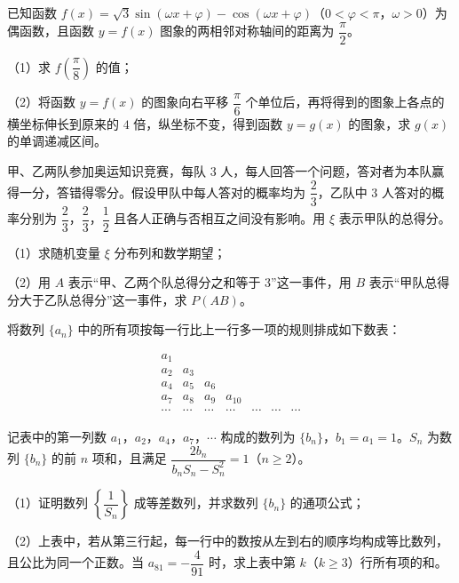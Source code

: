 \begin{question}
已知函数 $f(x)=\sqrt3\sin(\omega x+\varphi)-\cos(\omega x+\varphi)$（$0<\varphi<\pi$，$\omega>0$）为偶函数，且函数 $y=f(x)$ 图象的两相邻对称轴间的距离为 $\dfrac{\pi}{2}$。

（1）求 $f\left(\dfrac{\pi}{8}\right)$ 的值；

（2）将函数 $y=f(x)$ 的图象向右平移 $\dfrac{\pi}{6}$ 个单位后，再将得到的图象上各点的横坐标伸长到原来的 $4$ 倍，纵坐标不变，得到函数 $y=g(x)$ 的图象，求 $g(x)$ 的单调递减区间。

\end{question}
\begin{question}
甲、乙两队参加奥运知识竞赛，每队 $3$ 人，每人回答一个问题，答对者为本队赢得一分，答错得零分。假设甲队中每人答对的概率均为 $\dfrac23$，乙队中 $3$ 人答对的概率分别为 $\dfrac23$，$\dfrac23$，$\dfrac12$ 且各人正确与否相互之间没有影响。用 $\xi$ 表示甲队的总得分。

（1）求随机变量 $\xi$ 分布列和数学期望；

（2）用 $A$ 表示“甲、乙两个队总得分之和等于 $3$”这一事件，用 $B$ 表示“甲队总得分大于乙队总得分”这一事件，求 $P(AB)$。

\end{question}
\begin{question}
将数列 $\{a_n\}$ 中的所有项按每一行比上一行多一项的规则排成如下数表：

\nopagebreak[4]
\[\begin{array}{ccccccc}
a_1&&&&&&\\
a_2&a_3&&&&&\\
a_4&a_5&a_6&&&&\\
a_7&a_8&a_9&a_{10}&&&\\
\cdots&\cdots&\cdots&\cdots&\cdots&\cdots&\cdots
\end{array}\]

记表中的第一列数 $a_1$，$a_2$，$a_4$，$a_7$，$\cdots$ 构成的数列为 $\{b_n\}$，$b_1=a_1=1$。$S_n$ 为数列 $\{b_n\}$ 的前 $n$ 项和，且满足 $\dfrac{2b_n}{b_nS_n-S_n^2}=1$（$n\geqslant2$）。

（1）证明数列 $\left\{\dfrac1{S_n}\right\}$ 成等差数列，并求数列 $\{b_n\}$ 的通项公式；

（2）上表中，若从第三行起，每一行中的数按从左到右的顺序均构成等比数列，且公比为同一个正数。当 $a_{81}=-\dfrac4{91}$ 时，求上表中第 $k$（$k\geqslant3$）行所有项的和。

\Needspace{0.4\textheight}
\end{question}
\begingroup
\renewenvironment{question}{\Needspace{0.46\textheight}}{}
